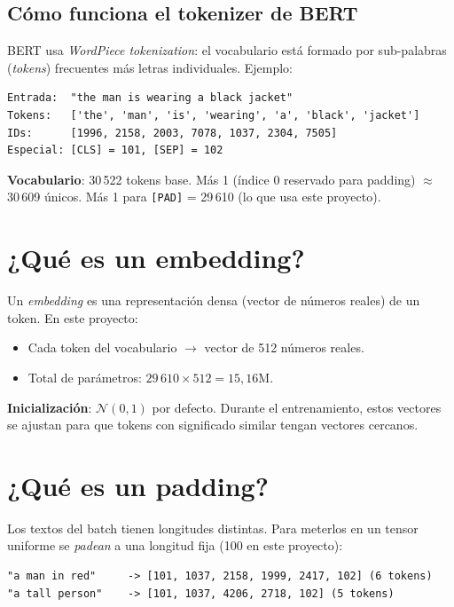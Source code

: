 \subsection{Cómo funciona el tokenizer de BERT}

BERT usa \emph{WordPiece tokenization}: el vocabulario está
formado por sub-palabras (\emph{tokens}) frecuentes más letras
individuales. Ejemplo:

\begin{verbatim}
Entrada:  "the man is wearing a black jacket"
Tokens:   ['the', 'man', 'is', 'wearing', 'a', 'black', 'jacket']
IDs:      [1996, 2158, 2003, 7078, 1037, 2304, 7505]
Especial: [CLS] = 101, [SEP] = 102
\end{verbatim}

\noindent\textbf{Vocabulario}: 30\,522 tokens base. Más 1 (índice
0 reservado para padding) $\approx$ 30\,609 únicos. Más 1 para
\texttt{[PAD]} = 29\,610 (lo que usa este proyecto).

\section{¿Qué es un embedding?}

Un \emph{embedding} es una representación densa (vector de
números reales) de un token. En este proyecto:

\begin{itemize}
  \item Cada token del vocabulario $\to$ vector de 512 números
        reales.
  \item Total de parámetros: $29\,610 \times 512 = 15,16$M.
\end{itemize}

\noindent\textbf{Inicialización}: $\mathcal{N}(0, 1)$ por defecto.
Durante el entrenamiento, estos vectores se ajustan para que
tokens con significado similar tengan vectores cercanos.

\section{¿Qué es un padding?}

Los textos del batch tienen longitudes distintas. Para meterlos
en un tensor uniforme se \emph{padean} a una longitud fija (100
en este proyecto):

\begin{verbatim}
"a man in red"     -> [101, 1037, 2158, 1999, 2417, 102] (6 tokens)
"a tall person"    -> [101, 1037, 4206, 2718, 102] (5 tokens)
\end{verbatim}

